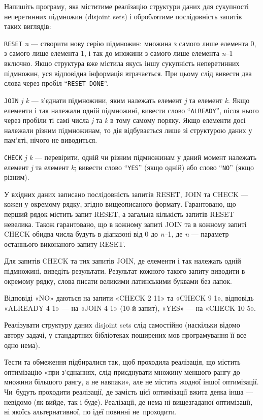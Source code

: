﻿Напишіть програму, яка міститиме реалізацію структури даних для сукупності неперетинних підмножин (disjoint sets) і оброблятиме послідовність запитів таких виглядів:

{\tt RESET} {\it n} --- створити нову серію підмножин: множина з самого лише елемента 0, з самого лише елемента 1, і так до множини з самого лише елемента {\it n}–1 включно. Якщо структура вже містила якусь іншу сукупність неперетинних підмножин, уся відповідна інформація втрачається. При цьому слід вивести два слова через пробіл ``{\tt RESET DONE}''.

{\tt JOIN} {\it j k} --- з’єднати підмножини, яким належать елемент {\it j} та елемент {\it k}. Якщо елементи і так належали одній підмножині, вивести слово ``{\tt ALREADY}'', після нього через пробіли ті самі числа {\it j} та {\it k} в тому самому поряку. Якщо елементи досі належали різним підмножинам, то дія відбувається лише зі структурою даних у пам’яті, нічого не виводиться.

{\tt CHECK} {\it j k} --- перевірити, одній чи різним підмножинам у даний момент належать елемент {\it j} та елемент {\it k}; вивести слово ``{\tt YES}'' (якщо одній) або слово ``{\tt NO}'' (якщо різним).

\InputFile
У вхідних даних записано послідовність запитів RESET, JOIN та CHECK --- кожен у окремому рядку, згідно вищеописаного формату. Гарантовано, що перший рядок містить запит RESET, а загальна кількість запитів RESET невелика. Також гарантовано, що в кожному запиті JOIN та в кожному запиті CHECK обидва числа будуть в діапазоні від 0 до {\it n}–1, де {\it n} --- параметр останнього виконаного запиту RESET.

\OutputFile
Для запитів CHECK та тих запитів JOIN, де елементи і так належать одній підмножині, виведіть результати. Результат кожного такого запиту виводити в окремому рядку, слова писати великими латинськими буквами без лапок.

\Examples

\begin{example}
\end{example}


\Note

Відповіді «NO» даються на запити «CHECK 2 11» та «CHECK 9 1», відповідь «ALREADY 4 1» — на «JOIN 4 1» (10-й запит), «YES» — на «CHECK 10 5».

Реалізувати структуру даних disjoint sets слід самостійно (наскільки відомо автору задачі, у стандартних  бібліотеках поширених мов програмування її все одно нема).

Тести та обмеження підбиралися так, щоб проходила реалізація, що містить оптимізацію «при з'єднаннях, слід приєднувати множину меншого рангу до множини більшого рангу, а не навпаки», але не містить жодної іншої оптимізації. Чи~будуть проходити реалізації, де замість цієї оптимізації вжита деяка інша --- невідомо (як вийде, так і буде). Реалізації, де нема ні вищезгаданої оптимізації, ні якоїсь альтернативної, по ідеї повинні не~проходити. 

